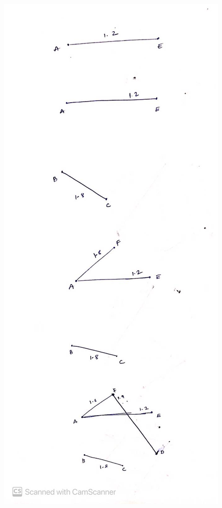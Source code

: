 \documentclass[11pt]{article}
\begin{document}
\includegraphics[scale = 0.2]{WhatsApp Image 2020-04-18 at 11.08.05 PM.jpeg}
\end{document}
